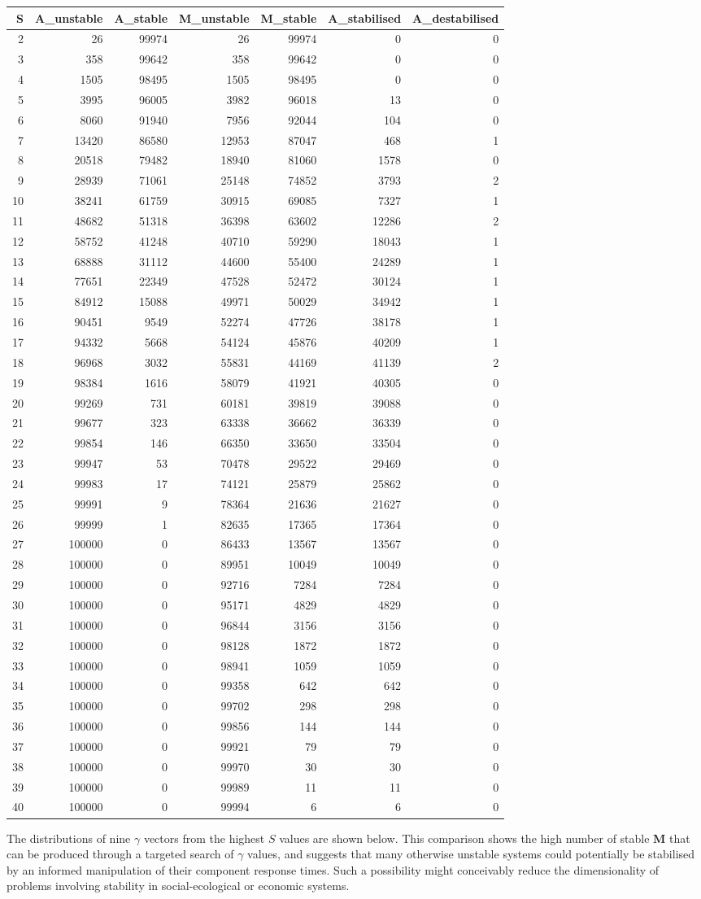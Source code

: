 \documentclass[]{article}
\begin{document}
\begin{longtable}[]{@{}rrrrrrr@{}}
\toprule
S & A\_unstable & A\_stable & M\_unstable & M\_stable & A\_stabilised &
A\_destabilised\tabularnewline
\midrule
\endhead
2 & 26 & 99974 & 26 & 99974 & 0 & 0\tabularnewline
3 & 358 & 99642 & 358 & 99642 & 0 & 0\tabularnewline
4 & 1505 & 98495 & 1505 & 98495 & 0 & 0\tabularnewline
5 & 3995 & 96005 & 3982 & 96018 & 13 & 0\tabularnewline
6 & 8060 & 91940 & 7956 & 92044 & 104 & 0\tabularnewline
7 & 13420 & 86580 & 12953 & 87047 & 468 & 1\tabularnewline
8 & 20518 & 79482 & 18940 & 81060 & 1578 & 0\tabularnewline
9 & 28939 & 71061 & 25148 & 74852 & 3793 & 2\tabularnewline
10 & 38241 & 61759 & 30915 & 69085 & 7327 & 1\tabularnewline
11 & 48682 & 51318 & 36398 & 63602 & 12286 & 2\tabularnewline
12 & 58752 & 41248 & 40710 & 59290 & 18043 & 1\tabularnewline
13 & 68888 & 31112 & 44600 & 55400 & 24289 & 1\tabularnewline
14 & 77651 & 22349 & 47528 & 52472 & 30124 & 1\tabularnewline
15 & 84912 & 15088 & 49971 & 50029 & 34942 & 1\tabularnewline
16 & 90451 & 9549 & 52274 & 47726 & 38178 & 1\tabularnewline
17 & 94332 & 5668 & 54124 & 45876 & 40209 & 1\tabularnewline
18 & 96968 & 3032 & 55831 & 44169 & 41139 & 2\tabularnewline
19 & 98384 & 1616 & 58079 & 41921 & 40305 & 0\tabularnewline
20 & 99269 & 731 & 60181 & 39819 & 39088 & 0\tabularnewline
21 & 99677 & 323 & 63338 & 36662 & 36339 & 0\tabularnewline
22 & 99854 & 146 & 66350 & 33650 & 33504 & 0\tabularnewline
23 & 99947 & 53 & 70478 & 29522 & 29469 & 0\tabularnewline
24 & 99983 & 17 & 74121 & 25879 & 25862 & 0\tabularnewline
25 & 99991 & 9 & 78364 & 21636 & 21627 & 0\tabularnewline
26 & 99999 & 1 & 82635 & 17365 & 17364 & 0\tabularnewline
27 & 100000 & 0 & 86433 & 13567 & 13567 & 0\tabularnewline
28 & 100000 & 0 & 89951 & 10049 & 10049 & 0\tabularnewline
29 & 100000 & 0 & 92716 & 7284 & 7284 & 0\tabularnewline
30 & 100000 & 0 & 95171 & 4829 & 4829 & 0\tabularnewline
31 & 100000 & 0 & 96844 & 3156 & 3156 & 0\tabularnewline
32 & 100000 & 0 & 98128 & 1872 & 1872 & 0\tabularnewline
33 & 100000 & 0 & 98941 & 1059 & 1059 & 0\tabularnewline
34 & 100000 & 0 & 99358 & 642 & 642 & 0\tabularnewline
35 & 100000 & 0 & 99702 & 298 & 298 & 0\tabularnewline
36 & 100000 & 0 & 99856 & 144 & 144 & 0\tabularnewline
37 & 100000 & 0 & 99921 & 79 & 79 & 0\tabularnewline
38 & 100000 & 0 & 99970 & 30 & 30 & 0\tabularnewline
39 & 100000 & 0 & 99989 & 11 & 11 & 0\tabularnewline
40 & 100000 & 0 & 99994 & 6 & 6 & 0\tabularnewline
\bottomrule
\end{longtable}

The distributions of nine \(\gamma\) vectors from the highest \(S\)
values are shown below. This comparison shows the high number of stable
\(\mathbf{M}\) that can be produced through a targeted search of
\(\gamma\) values, and suggests that many otherwise unstable systems
could potentially be stabilised by an informed manipulation of their
component response times. Such a possibility might conceivably reduce
the dimensionality of problems involving stability in social-ecological
or economic systems.
\end{document}
